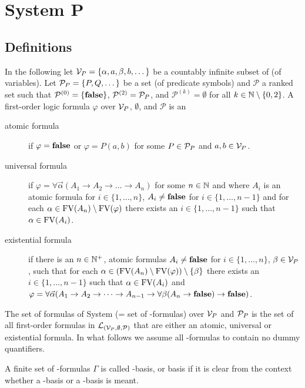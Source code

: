 \section{System P}\label{sec.3}
\subsection{Definitions}
In the following let $\mathcal{V}_P=\{\alpha,a,\beta,b,\dots\}$ be a countably infinite subset of \lambdaTypVar{} (of variables). 
Let $\mathcal{P}_P=\{P,Q,\dots\}$ be a set (of predicate symbols) and $\mathcal{P}$ a ranked set such that $\mathcal{P}^{(0)}=\{\textbf{false}\}$, $\mathcal{P}^{(2)}=\mathcal{P}_P$, and $\mathcal{P}^{(k)}=\emptyset$ for all $k\in\mathbb{N}\setminus\{0,2\}$.
A first-order logic formula $\varphi$ over $\mathcal{V}_P$, $\emptyset$, and $\mathcal{P}$ is an
\begin{description} %
	\item[atomic formula] if $\varphi=\textbf{false}$ or $\varphi=P(a,b)$ for some $P\in\mathcal{P}_P$ and $a,b\in\mathcal{V}_P$.
	\item[universal formula] if $\varphi=\forall\vec{\alpha}(A_1\to A_2 \to\dots\to A_n)$ for some $n\in\mathbb{N}$ and where $A_i$ is an atomic formula for $i\in\{1,\dots,n\}$, $A_i\neq\textbf{false}$ for $i\in\{1,\dots,n-1\}$ and for each $\alpha\in\text{FV}(A_n)\setminus\text{FV}(\varphi)$ %
	 there exists an $i\in\{1,\dots,n-1\}$ such that $\alpha\in\text{FV}(A_i)$.
	\item[existential formula] if there is an $n\in\mathbb{N}^+$, atomic formulas $A_i\neq\textbf{false}$ for $i\in\{1,\dots,n\}$, $\beta\in\mathcal{V}_P$, such that for each $\alpha\in(\text{FV}(A_n)\setminus\text{FV}(\varphi))\setminus\{\beta\}$ there exists an $i\in\{1,\dots,n-1\}$ such that $\alpha\in\text{FV}(A_i)$ and $\varphi=\forall\vec{\alpha}(A_1\to A_2 \to\dots\to A_{n-1}\to\forall\beta(A_n\to\textbf{false})\to\textbf{false})$.
\end{description}
The set of formulas of System \SysP{} (= set of \SysP-formulas) over $\mathcal{V}_P$ and $\mathcal{P}_P$ is the set of all first-order formulas in $\mathcal{L}_{(\mathcal{V}_P,\emptyset,\mathcal{P})}$ that are either an atomic, universal or existential formula. In what follows we assume all \SysP-formulas to contain no dummy quantifiers.

\begin{definition}\label{def.3.1}
A finite set of \SysP-formulas $\Gamma$ is called \SysP-basis, or basis if it is clear from the context whether a \SysP-basis or a \lambdaTwo-basis is meant.
\end{definition}

